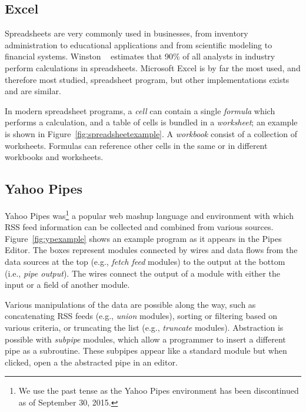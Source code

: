 \documentclass{sig-alternate}
\begin{document}
\subsection{Excel} Spreadsheets are very commonly used in businesses, from inventory administration to educational applications and from scientific modeling to financial systems.
Winston ~\cite{Wins2001} estimates that 90\% of all analysts in industry perform calculations in spreadsheets. 
Microsoft Excel is by far the most used, and therefore most studied, spreadsheet program, but other implementations exists and are similar.

In modern spreadsheet programs, a \textit{cell} can contain a single \textit{formula} which performs a calculation, and a table of cells is bundled in a \textit{worksheet}; an example is shown in Figure~\ref{fig:spreadsheetexample}. 
A \textit{workbook} consist of a collection of worksheets.
Formulas can reference other cells in the same or in different workbooks and worksheets.


\subsection{Yahoo Pipes}
Yahoo Pipes was\footnote{We use the past tense as the Yahoo Pipes environment has been discontinued as of September 30, 2015.} a popular web mashup language and environment with which RSS feed information can be collected and combined from various sources.  Figure~\ref{fig:ypexample} shows an example program as it appears in the Pipes Editor. The boxes represent modules connected by wires and data flows from the data sources at the top  (e.g., \emph{fetch feed} modules) to the output at the bottom (i.e., \emph{pipe output}). The wires connect the output of a module with either the input or a field of another module. 

Various manipulations of the data are possible along the  way, such as concatenating RSS feeds (e.g., \emph{union} modules), sorting  or filtering based on various criteria, or truncating the list (e.g., \emph{truncate} modules). 
Abstraction is possible with \emph{subpipe} modules, which allow a programmer to insert a different pipe as a subroutine. These subpipes appear like a standard module but when clicked, open a the abstracted pipe in an editor. 
\end{document}
